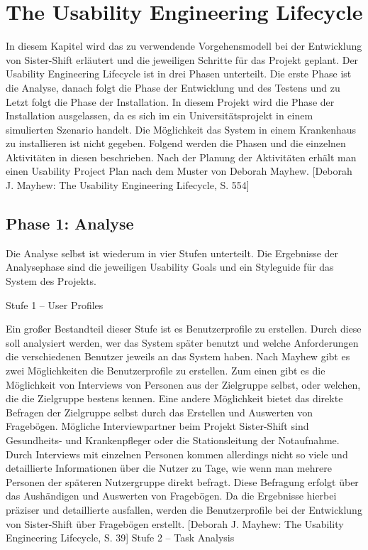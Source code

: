 \documentclass[11pt,
paper=a4,
bibtotocnumbered,	  %
liststotocnumbered,  %
DIV=calc,		  %
tablecaptionabove,	  %
headinclude,
]{article}
\begin{document}
\section{The Usability Engineering Lifecycle}
In diesem Kapitel wird das zu verwendende Vorgehensmodell bei der Entwicklung von Sister-Shift erläutert und die jeweiligen Schritte für das Projekt geplant. 
Der Usability Engineering Lifecycle ist in drei Phasen unterteilt. Die erste Phase ist die Analyse, danach folgt die Phase der Entwicklung und des Testens und zu Letzt folgt die Phase der Installation. In diesem Projekt wird die Phase der Installation ausgelassen, da es sich im ein Universitätsprojekt in einem simulierten Szenario handelt. Die Möglichkeit das System in einem Krankenhaus zu installieren ist nicht gegeben. Folgend werden die Phasen und die einzelnen Aktivitäten in diesen beschrieben. Nach der Planung der Aktivitäten erhält man einen Usability Project Plan nach dem Muster von Deborah Mayhew. [Deborah J. Mayhew: The Usability Engineering Lifecycle, S. 554]
\subsection{Phase 1: Analyse}
Die Analyse selbst ist wiederum in vier Stufen unterteilt. Die Ergebnisse der Analysephase sind die jeweiligen Usability Goals und ein Styleguide für das System des Projekts.

Stufe 1 – User Profiles

Ein großer Bestandteil dieser Stufe ist es Benutzerprofile zu erstellen. Durch diese soll analysiert werden, wer das System später benutzt und welche Anforderungen die verschiedenen Benutzer jeweils an das System haben. Nach Mayhew gibt es zwei Möglichkeiten die Benutzerprofile zu erstellen. Zum einen gibt es die Möglichkeit von Interviews von Personen aus der Zielgruppe selbst, oder welchen, die die Zielgruppe bestens kennen. Eine andere Möglichkeit bietet das direkte Befragen der Zielgruppe selbst durch das Erstellen und Auswerten von Fragebögen. Mögliche Interviewpartner beim Projekt Sister-Shift sind Gesundheits- und Krankenpfleger oder die Stationsleitung der Notaufnahme. Durch Interviews mit einzelnen Personen kommen allerdings nicht so viele und detaillierte Informationen über die Nutzer zu Tage, wie wenn man mehrere Personen der späteren Nutzergruppe direkt befragt. Diese Befragung erfolgt über das Aushändigen und Auswerten von Fragebögen. Da die Ergebnisse hierbei präziser und detaillierte ausfallen, werden die Benutzerprofile bei der Entwicklung von Sister-Shift über Fragebögen erstellt. [Deborah J. Mayhew: The Usability Engineering Lifecycle, S. 39]
Stufe 2 – Task Analysis
\end{document}
